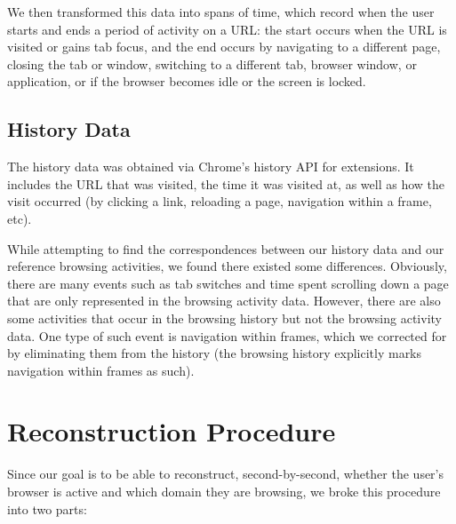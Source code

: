 \documentclass{sigchi}
\begin{document}
We then transformed this data into spans of time, which record when the user starts and ends a period of activity on a URL: the start occurs when the URL is visited or gains tab focus, and the end occurs by navigating to a different page, closing the tab or window, switching to a different tab, browser window, or application, or if the browser becomes idle or the screen is locked.


\subsection{History Data}

The history data was obtained via Chrome's history API for extensions. It includes the URL that was visited, the time it was visited at, as well as how the visit occurred (by clicking a link, reloading a page, navigation within a frame, etc).

While attempting to find the correspondences between our history data and our reference browsing activities, we found there existed some differences. Obviously, there are many events such as tab switches and time spent scrolling down a page that are only represented in the browsing activity data. However, there are also some activities that occur in the browsing history but not the browsing activity data. One type of such event is navigation within frames, which we corrected for by eliminating them from the history (the browsing history explicitly marks navigation within frames as such). %

\section{Reconstruction Procedure}

Since our goal is to be able to reconstruct, second-by-second, whether the user's browser is active and which domain they are browsing, we broke this procedure into two parts:
\end{document}
